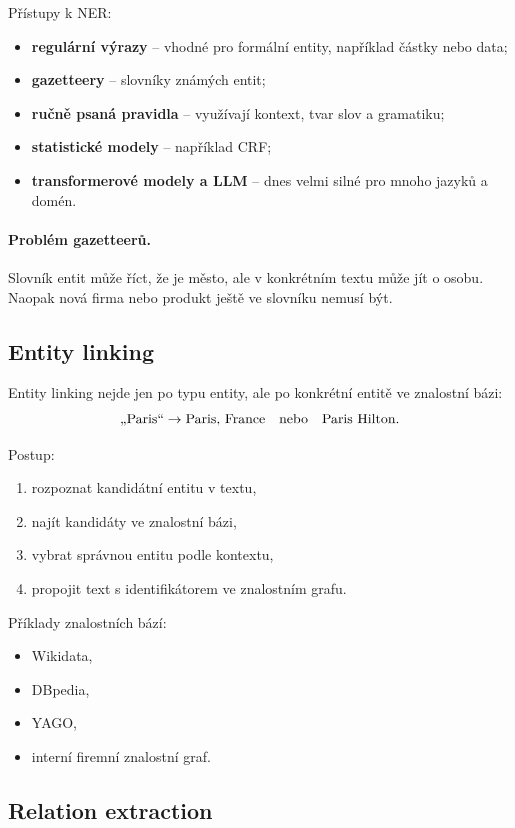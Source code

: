 Přístupy k NER:
\begin{itemize}
    \item \textbf{regulární výrazy} -- vhodné pro formální entity, například částky nebo data;
    \item \textbf{gazetteery} -- slovníky známých entit;
    \item \textbf{ručně psaná pravidla} -- využívají kontext, tvar slov a gramatiku;
    \item \textbf{statistické modely} -- například CRF;
    \item \textbf{transformerové modely a LLM} -- dnes velmi silné pro mnoho jazyků a domén.
\end{itemize}

\paragraph{Problém gazetteerů.}
Slovník entit může říct, že  je město, ale v konkrétním textu může jít o osobu. Naopak nová firma
nebo produkt ještě ve slovníku nemusí být.

\subsection{Entity linking}

Entity linking nejde jen po typu entity, ale po konkrétní entitě ve znalostní bázi:
\[
\text{\uv{Paris}}
\rightarrow
\text{Paris, France}
\quad
\text{nebo}
\quad
\text{Paris Hilton}.
\]

Postup:
\begin{enumerate}
    \item rozpoznat kandidátní entitu v textu,
    \item najít kandidáty ve znalostní bázi,
    \item vybrat správnou entitu podle kontextu,
    \item propojit text s identifikátorem ve znalostním grafu.
\end{enumerate}

Příklady znalostních bází:
\begin{itemize}
    \item Wikidata,
    \item DBpedia,
    \item YAGO,
    \item interní firemní znalostní graf.
\end{itemize}

\subsection{Relation extraction}

